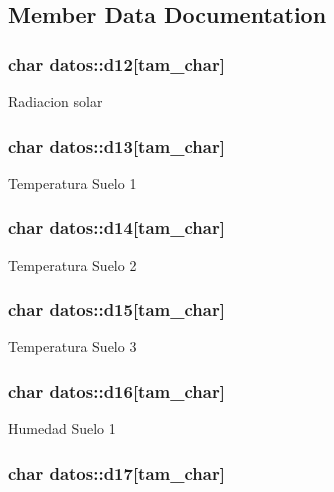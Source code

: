 \subsection{Member Data Documentation}
\hypertarget{structdatos_afb580e824f760aca0244ac3dcea00f34}{
\subsubsection[{d12}]{\setlength{\rightskip}{0pt plus 5cm}char datos\-::d12\mbox{[}tam\-\_\-char\mbox{]}}}\label{structdatos_afb580e824f760aca0244ac3dcea00f34}
Radiacion solar \hypertarget{structdatos_a4703a24c709b7013b569abc0ae48bb5b}{
\subsubsection[{d13}]{\setlength{\rightskip}{0pt plus 5cm}char datos\-::d13\mbox{[}tam\-\_\-char\mbox{]}}}\label{structdatos_a4703a24c709b7013b569abc0ae48bb5b}
Temperatura Suelo 1 \hypertarget{structdatos_ad99c591c4ce01fd087bab7596743bd75}{
\subsubsection[{d14}]{\setlength{\rightskip}{0pt plus 5cm}char datos\-::d14\mbox{[}tam\-\_\-char\mbox{]}}}\label{structdatos_ad99c591c4ce01fd087bab7596743bd75}
Temperatura Suelo 2 \hypertarget{structdatos_a0e1c3befa682a592a21f3f4b237537cd}{
\subsubsection[{d15}]{\setlength{\rightskip}{0pt plus 5cm}char datos\-::d15\mbox{[}tam\-\_\-char\mbox{]}}}\label{structdatos_a0e1c3befa682a592a21f3f4b237537cd}
Temperatura Suelo 3 \hypertarget{structdatos_a12b7feb84565679113969ea33baea2d7}{
\subsubsection[{d16}]{\setlength{\rightskip}{0pt plus 5cm}char datos\-::d16\mbox{[}tam\-\_\-char\mbox{]}}}\label{structdatos_a12b7feb84565679113969ea33baea2d7}
Humedad Suelo 1 \hypertarget{structdatos_ad2c2edd1f369b99799b08a7fd555b958}{
\subsubsection[{d17}]{\setlength{\rightskip}{0pt plus 5cm}char datos\-::d17\mbox{[}tam\-\_\-char\mbox{]}}}\label{structdatos_ad2c2edd1f369b99799b08a7fd555b958}
